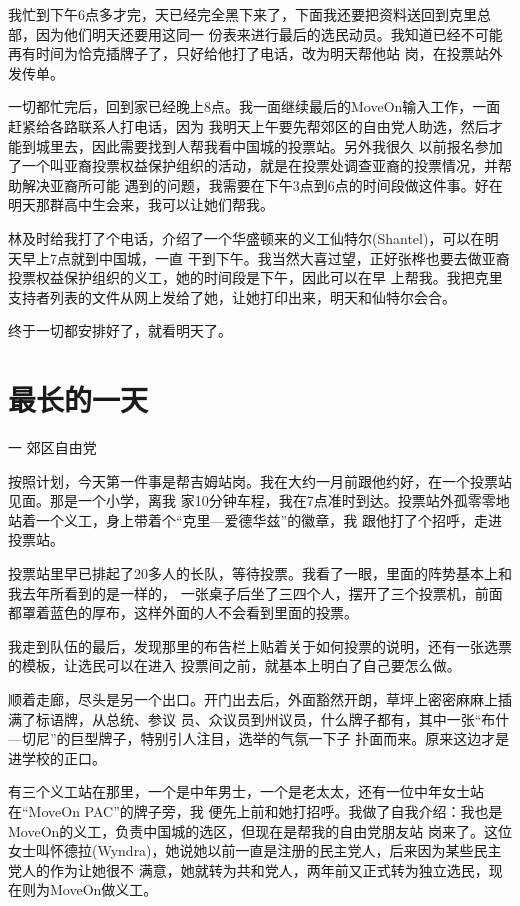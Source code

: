 ﻿\documentclass[11pt]{article}
\begin{document}
我忙到下午6点多才完，天已经完全黑下来了，下面我还要把资料送回到克里总部，因为他们明天还要用这同一
份表来进行最后的选民动员。我知道已经不可能再有时间为恰克插牌子了，只好给他打了电话，改为明天帮他站
岗，在投票站外发传单。

一切都忙完后，回到家已经晚上8点。我一面继续最后的MoveOn输入工作，一面赶紧给各路联系人打电话，因为
我明天上午要先帮郊区的自由党人助选，然后才能到城里去，因此需要找到人帮我看中国城的投票站。另外我很久
以前报名参加了一个叫亚裔投票权益保护组织的活动，就是在投票处调查亚裔的投票情况，并帮助解决亚裔所可能
遇到的问题，我需要在下午3点到6点的时间段做这件事。好在明天那群高中生会来，我可以让她们帮我。

林及时给我打了个电话，介绍了一个华盛顿来的义工仙特尔(Shantel)，可以在明天早上7点就到中国城，一直
干到下午。我当然大喜过望，正好张桦也要去做亚裔投票权益保护组织的义工，她的时间段是下午，因此可以在早
上帮我。我把克里支持者列表的文件从网上发给了她，让她打印出来，明天和仙特尔会合。

终于一切都安排好了，就看明天了。

\section{最长的一天}

一 郊区自由党

按照计划，今天第一件事是帮吉姆站岗。我在大约一月前跟他约好，在一个投票站见面。那是一个小学，离我
家10分钟车程，我在7点准时到达。投票站外孤零零地站着一个义工，身上带着个``克里---爱德华兹''的徽章，我
跟他打了个招呼，走进投票站。

投票站里早已排起了20多人的长队，等待投票。我看了一眼，里面的阵势基本上和我去年所看到的是一样的，
一张桌子后坐了三四个人，摆开了三个投票机，前面都罩着蓝色的厚布，这样外面的人不会看到里面的投票。

我走到队伍的最后，发现那里的布告栏上贴着关于如何投票的说明，还有一张选票的模板，让选民可以在进入
投票间之前，就基本上明白了自己要怎么做。

顺着走廊，尽头是另一个出口。开门出去后，外面豁然开朗，草坪上密密麻麻上插满了标语牌，从总统、参议
员、众议员到州议员，什么牌子都有，其中一张``布什---切尼''的巨型牌子，特别引人注目，选举的气氛一下子
扑面而来。原来这边才是进学校的正口。

有三个义工站在那里，一个是中年男士，一个是老太太，还有一位中年女士站在``MoveOn PAC''的牌子旁，我
便先上前和她打招呼。我做了自我介绍：我也是MoveOn的义工，负责中国城的选区，但现在是帮我的自由党朋友站
岗来了。这位女士叫怀德拉(Wyndra)，她说她以前一直是注册的民主党人，后来因为某些民主党人的作为让她很不
满意，她就转为共和党人，两年前又正式转为独立选民，现在则为MoveOn做义工。
\end{document}
